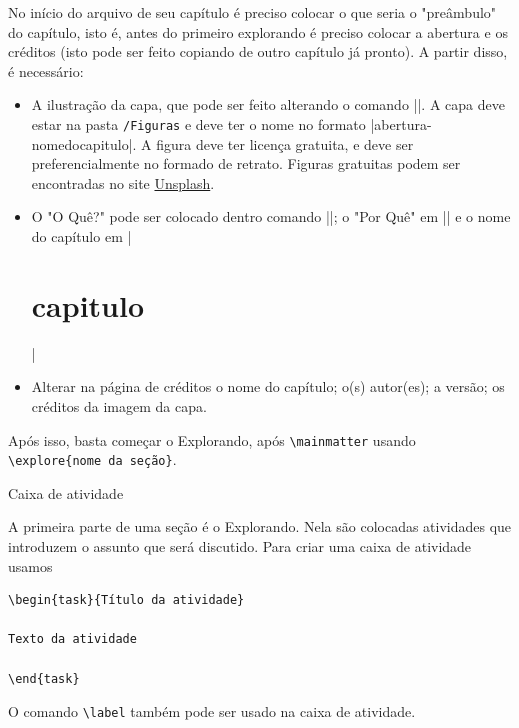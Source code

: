 No início do arquivo de seu capítulo é preciso colocar o que seria o "preâmbulo"{} do capítulo, isto é, antes do primeiro explorando é preciso colocar a abertura e os créditos (isto pode ser feito copiando de outro capítulo já pronto). A partir disso, é necessário:

\begin{itemize}
\item A ilustração da capa, que pode ser feito alterando o comando \spverb|\renewcommand\chapterillustration{./imagemdacapa}|. A capa deve estar na pasta \verb|/Figuras| e deve ter o nome no formato \spverb|abertura-nomedocapitulo|. A figura deve ter licença gratuita, e deve ser preferencialmente no formado de retrato. Figuras gratuitas podem ser encontradas no site \href{https://unsplash.com/}{Unsplash}.

\item O "O Quê?"{} pode ser colocado dentro comando \spverb|\renewcommand\chapterwhat{o que}|; o "Por Quê"{} em \spverb|\renewcommand\chapterbecause{por que}| e o nome do capítulo em \spverb|\chapter{capitulo}|

\item Alterar na página de créditos o nome do capítulo; o(s) autor(es); a versão; os créditos da imagem da capa.
\end{itemize}

Após isso, basta começar o Explorando, após \verb|\mainmatter| usando \verb|\explore{nome da seção}|.

\begin{task}{Caixa de atividade}

A primeira parte de uma seção é o Explorando. Nela são colocadas atividades que introduzem o assunto que será discutido. Para criar uma caixa de atividade usamos
\begin{verbatim}
\begin{task}{Título da atividade}

Texto da atividade

\end{task}
\end{verbatim} 

O comando \verb|\label| também pode ser usado na caixa de atividade.
\end{task}


